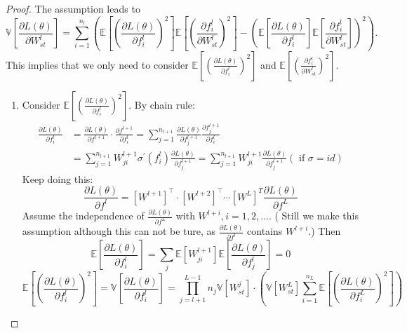 \begin{proof}
The assumption leads to
\begin{equation}\label{normale0}
\mathbb{V}\left[\frac{\partial L(\theta)}{\partial W_{st}^{l}}\right]=\sum\limits_{i=1}^{n_{l}}\left( \mathbb{E}\left[\left(\frac{\partial L(\theta)}{\partial f^{l}_{i}}\right)^{2}\right] \mathbb{E}\left[\left(\frac{\partial f_{i}^{l}}{\partial W_{s t}^{l}}\right)^{2}\right] - \left(\mathbb{E}\left[\frac{\partial L(\theta)}{\partial f_{i}^{l}}\right] \mathbb{E}\left[\frac{\partial f_{i}^{l}}{\partial W_{s t}^{l}}\right]\right)^{2}\right) .
\end{equation}
This implies that we only need to consider $ \mathbb{E}\left[\left(\frac{\partial L(\theta)}{\partial f_{i}^{l}}\right)^{2}\right] $ and  $ \mathbb{E}\left[\left(\frac{\partial f_{i}^{l}}{\partial W_{s t}^{l}}\right)^{2}\right]$.
\begin{enumerate}
\item Consider $ \mathbb{E}\left[\left(\frac{\partial L(\theta)}{\partial f_{i}^{l}}\right)^{2}\right] $. By chain rule:
	$$
	\begin{aligned} 
	\frac{\partial L(\theta)}{\partial f_{i}^{l}} &=\frac{\partial L(\theta)}{\partial f^{l+1}}\cdot \frac{\partial f^{l+1}}{\partial f_{i}^{l}} =\sum_{j=1}^{n_{l+1}} \frac{\partial L(\theta)}{\partial f_{j}^{l+1}} \frac{\partial f_{j}^{l+1}}{\partial f_{i}^{l}}
	 \\ &=\sum_{j=1}^{n_{l+1}} W_{j i}^{l+1} \sigma^{\prime}\left(f_{i}^{l}\right) \frac{\partial L(\theta)}{\partial f_{j}^{l+1}}=\sum\limits_{j=1}^{n_{l+1}} W_{j i}^{l+1} \frac{\partial L(\theta)}{\partial f_{j}^{l+1}}(\mbox{ if }\sigma=id)
	\end{aligned} 
	$$
	Keep doing this:
	$$
	\frac{\partial L(\theta)}{\partial f^{l}}=\left[W^{l+1}\right]^{\top} \cdot\left[W^{l+2}\right]^{\top} \cdots\left[W^{L}\right]^{T} \frac{\partial L(\theta)}{\partial f^{L}}
	$$
	Assume the independence of $ \frac{\partial L(\theta)}{\partial f^{L}} $  with $W^{l+i}, i= 1,2, \dots$.
	( Still we make this assumption although this can not be ture, as $ \frac{\partial L(\theta)}{\partial f^{l}} $ contains  $W^{l+i}$.) Then 
	$$
	\mathbb{E}\left[\frac{\partial L(\theta)}{\partial f_{i}^{l}}\right]=\sum\limits_{j} \mathbb{E}\left[W_{j i}^{l+1}\right] \mathbb{E}\left[\frac{\partial L(\theta)}{\partial f_{j}^{l }}\right]=0
	$$
	\begin{equation}\label{normale1}
	\mathbb{E}\left[\left(\frac{\partial L(\theta)}{\partial f_{i}^{l}}\right)^{2}\right]=\mathbb{V}\left[{\frac{\partial L(\theta)}{\partial f_{i}^{l}}}\right]=\prod\limits_{j=l+1}^{L-1} n_{j} \mathbb{V}\left[W_{s t}^{j}\right] \cdot\left(\mathbb{V}\left[W_{s t}^{L}\right] \sum\limits_{i=1}^{n_{L}} \mathbb{E}\left[\left(\frac{\partial L( \theta)}{\partial f_{i}^{L}}\right)^{2}\right]\right)

\end{equation}
\end{enumerate}
\end{proof}
